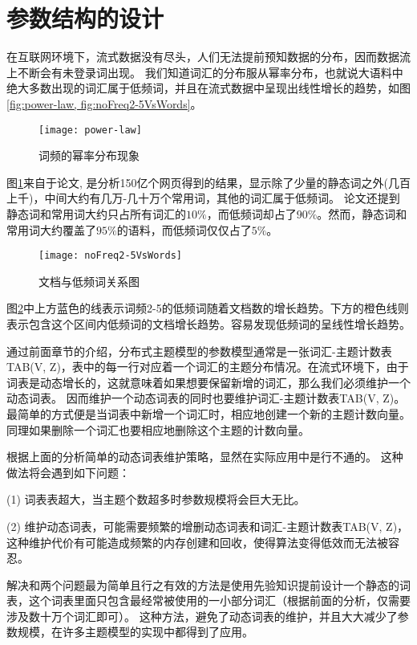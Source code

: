 \section{参数结构的设计}
在互联网环境下，流式数据没有尽头，人们无法提前预知数据的分布，因而数据流上不断会有未登录词出现。
我们知道词汇的分布服从幂率分布，也就说大语料中绝大多数出现的词汇属于低频词，并且在流式数据中呈现出线性增长的趋势，如图\ref{fig:power-law, fig:noFreq2-5VsWords}。

\begin{figure}[htb]\centering
\texttt{[image: power-law]}
\caption{词频的幂率分布现象}
\label{fig:power-law}       %
\end{figure}

图\ref{fig:power-law}来自于论文\cite{yuan2015lightlda}, 是分析150亿个网页得到的结果，显示除了少量的静态词之外(几百上千)，中间大约有几万-几十万个常用词，其他的词汇属于低频词。
论文\cite{yuan2015lightlda}还提到静态词和常用词大约只占所有词汇的$10\%$，而低频词却占了$90\%$。然而，静态词和常用词大约覆盖了$95\%$的语料，而低频词仅仅占了$5\%$。

\begin{figure}[htb]\centering
\texttt{[image: noFreq2-5VsWords]}
\caption{文档与低频词关系图}
\label{fig:noFreq2-5VsWords}       %
\end{figure}

图\ref{fig:noFreq2-5VsWords}中上方蓝色的线表示词频2-5的低频词随着文档数的增长趋势。下方的橙色线则表示包含这个区间内低频词的文档增长趋势。容易发现低频词的呈线性增长趋势。

通过前面章节的介绍，分布式主题模型的参数模型通常是一张词汇-主题计数表TAB(V, Z)，表中的每一行对应着一个词汇的主题分布情况。在流式环境下，由于词表是动态增长的，这就意味着如果想要保留新增的词汇，那么我们必须维护一个动态词表。
因而维护一个动态词表的同时也要维护词汇-主题计数表TAB(V, Z)。
最简单的方式便是当词表中新增一个词汇时，相应地创建一个新的主题计数向量。
同理如果删除一个词汇也要相应地删除这个主题的计数向量。

根据上面的分析简单的动态词表维护策略，显然在实际应用中是行不通的。
这种做法将会遇到如下问题：

(1) 词表表超大，当主题个数超多时参数规模将会巨大无比。

(2) 维护动态词表，可能需要频繁的增删动态词表和词汇-主题计数表TAB(V, Z)，这种维护代价有可能造成频繁的内存创建和回收，使得算法变得低效而无法被容忍。

解决和两个问题最为简单且行之有效的方法是使用先验知识提前设计一个静态的词表，这个词表里面只包含最经常被使用的一小部分词汇（根据前面的分析，仅需要涉及数十万个词汇即可）。
这种方法，避免了动态词表的维护，并且大大减少了参数规模，在许多主题模型的实现中都得到了应用。

